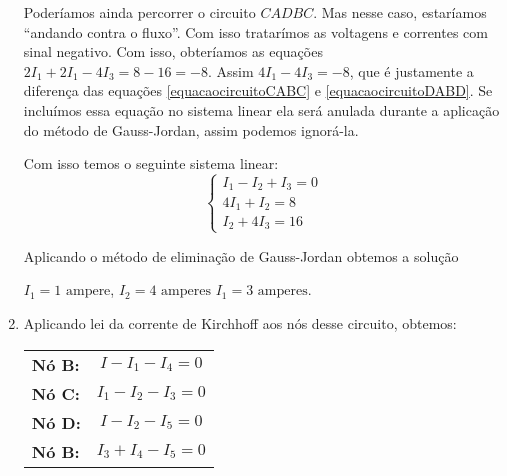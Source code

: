 \begin{exemplos}
\begin{solucao}
\begin{enumerate}
            Poderíamos ainda percorrer o circuito $CADBC$. Mas nesse caso, estaríamos ``andando contra o fluxo''. Com isso tratarímos as voltagens e correntes com sinal negativo. Com isso, obteríamos as equações $2I_1 + 2I_1 - 4I_3 = 8 - 16 = -8$. Assim $4I_1 - 4I_3 = -8$, que é justamente a diferença das equações \eqref{equacaocircuitoCABC} e \eqref{equacaocircuitoDABD}. Se incluímos essa equação no sistema linear ela será anulada durante a aplicação do método de Gauss-Jordan, assim podemos ignorá-la.

            Com isso temos o seguinte sistema linear:
            \[
                \begin{cases}
                    I_1 - I_2 + I_3 = 0\\
                    4I_1 + I_2 = 8\\
                    I_2 + 4I_3 = 16
                \end{cases}
            \]

            Aplicando o método de eliminação de Gauss-Jordan obtemos a solução
            \begin{center}
                $I_1 = 1 \mbox{ ampere}$, $I_2 = 4 \mbox{ amperes}$ $I_1 = 3 \mbox{ amperes}$.
            \end{center}

            \item Aplicando lei da corrente de Kirchhoff aos nós desse circuito, obtemos:
            \begin{center}
                \begin{tabular}{lc}
                    \textbf{Nó B:} & $I - I_1 - I_4 = 0$\\
                    \textbf{Nó C:} & $I_1 - I_2 - I_3 = 0$\\
                    \textbf{Nó D:} & $I - I_2 - I_5 = 0$\\
                    \textbf{Nó B:}& $I_3 + I_4 - I_5 = 0$
                \end{tabular}
            \end{center}


\end{enumerate}
\end{solucao}
\end{exemplos}
